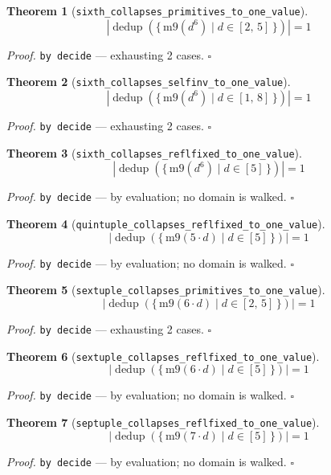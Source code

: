 \documentclass[11pt]{article}
\newtheorem{theorem}{Theorem}[section]
\begin{document}
\begin{theorem}[\texttt{sixth\_collapses\_primitives\_to\_one\_value}]
\[ \left|\operatorname{dedup}\left(\{\, \mathrm{m9}\mathopen{}\left(d^{6}\right) \mid d \in [2,\,5] \,\}\right)\right| = 1 \]
\end{theorem}
\noindent\emph{Proof.} \texttt{by decide} --- exhausting 2 cases. \hfill$\square$

\begin{theorem}[\texttt{sixth\_collapses\_selfinv\_to\_one\_value}]
\[ \left|\operatorname{dedup}\left(\{\, \mathrm{m9}\mathopen{}\left(d^{6}\right) \mid d \in [1,\,8] \,\}\right)\right| = 1 \]
\end{theorem}
\noindent\emph{Proof.} \texttt{by decide} --- exhausting 2 cases. \hfill$\square$

\begin{theorem}[\texttt{sixth\_collapses\_reflfixed\_to\_one\_value}]
\[ \left|\operatorname{dedup}\left(\{\, \mathrm{m9}\mathopen{}\left(d^{6}\right) \mid d \in [5] \,\}\right)\right| = 1 \]
\end{theorem}
\noindent\emph{Proof.} \texttt{by decide} --- by evaluation; no domain is walked. \hfill$\square$

\begin{theorem}[\texttt{quintuple\_collapses\_reflfixed\_to\_one\_value}]
\[ \left|\operatorname{dedup}\left(\{\, \mathrm{m9}\mathopen{}\left(5 \cdot d\right) \mid d \in [5] \,\}\right)\right| = 1 \]
\end{theorem}
\noindent\emph{Proof.} \texttt{by decide} --- by evaluation; no domain is walked. \hfill$\square$

\begin{theorem}[\texttt{sextuple\_collapses\_primitives\_to\_one\_value}]
\[ \left|\operatorname{dedup}\left(\{\, \mathrm{m9}\mathopen{}\left(6 \cdot d\right) \mid d \in [2,\,5] \,\}\right)\right| = 1 \]
\end{theorem}
\noindent\emph{Proof.} \texttt{by decide} --- exhausting 2 cases. \hfill$\square$

\begin{theorem}[\texttt{sextuple\_collapses\_reflfixed\_to\_one\_value}]
\[ \left|\operatorname{dedup}\left(\{\, \mathrm{m9}\mathopen{}\left(6 \cdot d\right) \mid d \in [5] \,\}\right)\right| = 1 \]
\end{theorem}
\noindent\emph{Proof.} \texttt{by decide} --- by evaluation; no domain is walked. \hfill$\square$

\begin{theorem}[\texttt{septuple\_collapses\_reflfixed\_to\_one\_value}]
\[ \left|\operatorname{dedup}\left(\{\, \mathrm{m9}\mathopen{}\left(7 \cdot d\right) \mid d \in [5] \,\}\right)\right| = 1 \]
\end{theorem}
\noindent\emph{Proof.} \texttt{by decide} --- by evaluation; no domain is walked. \hfill$\square$
\end{document}
